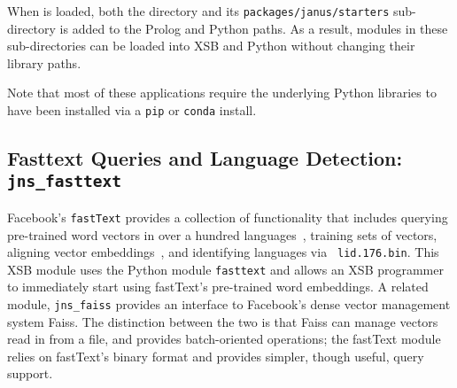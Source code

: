 When \janus{} is loaded, both the \janus{} directory and its
{\tt packages/janus/starters} sub-directory is added to the Prolog and
Python paths.  As a result, modules in these sub-directories can be
loaded into XSB and Python without changing their library paths.

Note that most of these applications require the underlying Python
libraries to have been installed via a {\tt pip} or {\tt conda}
install.

\subsection{Fasttext Queries and Language Detection: {\tt jns\_fasttext}}
%
Facebook's {\tt fastText} provides a collection of functionality that
includes querying pre-trained word vectors in over a hundred
languages~\cite{FBFJM18}, training sets of vectors, aligning vector
embeddings~\cite{MUSE2018}, and identifying languages via {\tt
  lid.176.bin}.  This XSB module uses the Python module {\tt fasttext}
and allows an XSB programmer to immediately start using fastText's
pre-trained word embeddings.  A related module, {\tt jns\_faiss}
provides an interface to Facebook's dense vector management system
Faiss.  The distinction between the two is that Faiss can manage
vectors read in from a file, and provides batch-oriented operations;
the fastText module relies on fastText's binary format and provides
simpler, though useful, query support.

